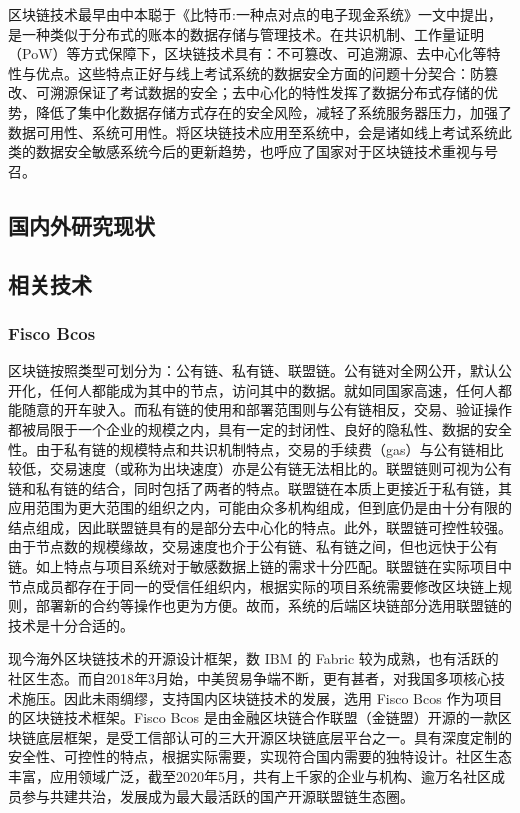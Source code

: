 区块链技术最早由中本聪于《比特币:一种点对点的电子现金系统》一文中提出，是一种类似于分布式的账本的数据存储与管理技术。在共识机制、工作量证明（PoW）等方式保障下，区块链技术具有：不可篡改、可追溯源、去中心化等特性与优点。这些特点正好与线上考试系统的数据安全方面的问题十分契合：防篡改、可溯源保证了考试数据的安全；去中心化的特性发挥了数据分布式存储的优势，降低了集中化数据存储方式存在的安全风险，减轻了系统服务器压力，加强了数据可用性、系统可用性。将区块链技术应用至系统中，会是诸如线上考试系统此类的数据安全敏感系统今后的更新趋势，也呼应了国家对于区块链技术重视与号召。

\subsection{国内外研究现状}

\subsection{相关技术}
\subsubsection{Fisco Bcos}
区块链按照类型可划分为：公有链、私有链、联盟链。公有链对全网公开，默认公开化，任何人都能成为其中的节点，访问其中的数据。就如同国家高速，任何人都能随意的开车驶入。而私有链的使用和部署范围则与公有链相反，交易、验证操作都被局限于一个企业的规模之内，具有一定的封闭性、良好的隐私性、数据的安全性。由于私有链的规模特点和共识机制特点，交易的手续费（gas）与公有链相比较低，交易速度（或称为出块速度）亦是公有链无法相比的。联盟链则可视为公有链和私有链的结合，同时包括了两者的特点。联盟链在本质上更接近于私有链，其应用范围为更大范围的组织之内，可能由众多机构组成，但到底仍是由十分有限的结点组成，因此联盟链具有的是部分去中心化的特点。此外，联盟链可控性较强。由于节点数的规模缘故，交易速度也介于公有链、私有链之间，但也远快于公有链。如上特点与项目系统对于敏感数据上链的需求十分匹配。联盟链在实际项目中节点成员都存在于同一的受信任组织内，根据实际的项目系统需要修改区块链上规则，部署新的合约等操作也更为方便。故而，系统的后端区块链部分选用联盟链的技术是十分合适的。

现今海外区块链技术的开源设计框架，数 IBM 的 Fabric 较为成熟，也有活跃的社区生态。而自2018年3月始，中美贸易争端不断，更有甚者，对我国多项核心技术施压。因此未雨绸缪，支持国内区块链技术的发展，选用 Fisco Bcos 作为项目的区块链技术框架。Fisco Bcos 是由金融区块链合作联盟（金链盟）开源的一款区块链底层框架，是受工信部认可的三大开源区块链底层平台之一。具有深度定制的安全性、可控性的特点，根据实际需要，实现符合国内需要的独特设计。社区生态丰富，应用领域广泛，截至2020年5月，共有上千家的企业与机构、逾万名社区成员参与共建共治，发展成为最大最活跃的国产开源联盟链生态圈。

